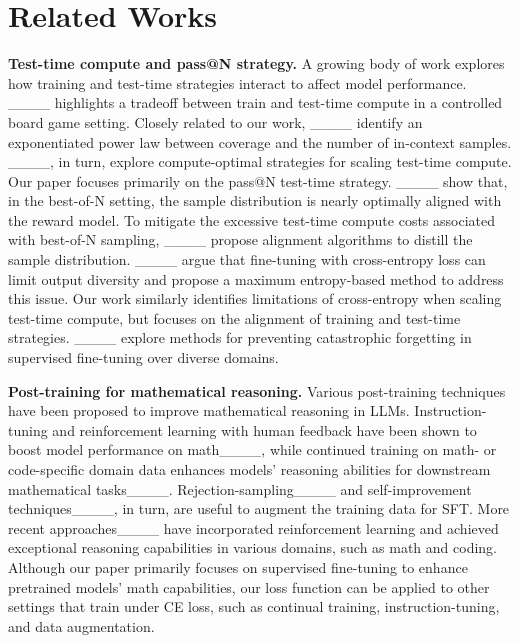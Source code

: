 \section{Related Works}
\label{sec:relatedworks}

%
%

%

\textbf{Test-time compute and pass@N strategy.} 
%
%
%
A growing body of work explores how training and test-time strategies interact to affect model performance.
____ highlights a tradeoff between train and test-time compute in a controlled board game setting.
%
Closely related to our work, ____ identify an exponentiated power law between coverage and the number of in-context samples. ____, in turn, explore compute-optimal strategies for scaling test-time compute. Our paper focuses primarily on the pass@N test-time strategy.
____ show that, in the best-of-N setting, the sample distribution is nearly optimally aligned with the reward model. To mitigate the excessive test-time compute costs associated with best-of-N sampling, ____ propose alignment algorithms to distill the sample distribution. ____ argue that fine-tuning with cross-entropy loss can limit output diversity and propose a maximum entropy-based method to address this issue. Our work similarly identifies limitations of cross-entropy when scaling test-time compute, but focuses on the alignment of training and test-time strategies. ____ explore methods for preventing catastrophic forgetting in supervised fine-tuning over diverse domains. 

%
\textbf{Post-training for mathematical reasoning.}
Various post-training techniques have been proposed to improve mathematical reasoning in LLMs. Instruction-tuning and reinforcement learning with human feedback have been shown to boost model performance on math____, while continued training on math- or code-specific domain data enhances models' reasoning abilities for downstream mathematical tasks____.
%
%
%
Rejection-sampling____ and self-improvement techniques____, in turn, are useful to augment the training data for SFT.
%
More recent approaches____ have incorporated reinforcement learning and achieved exceptional reasoning capabilities in various domains, such as math and coding.
%
Although our paper primarily focuses on supervised fine-tuning to enhance pretrained models' math capabilities, our loss function can be applied to other settings that train under CE loss, such as continual training, instruction-tuning, and data augmentation.
%
%
%
%
%
%
%
%
%
%
%
%


